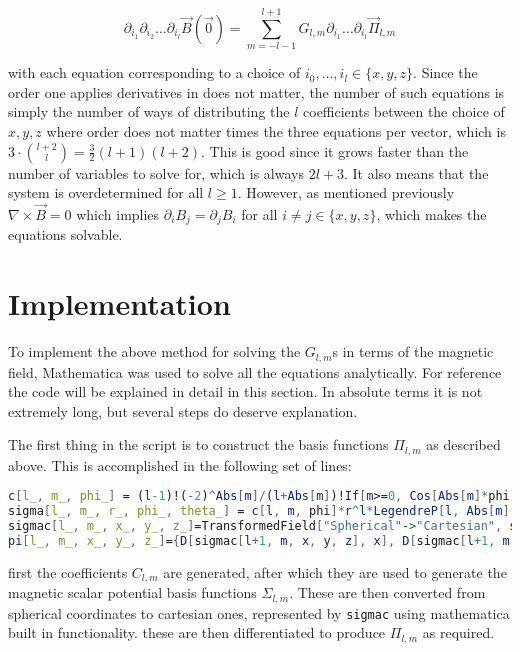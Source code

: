 \documentclass{article}
\begin{document}
\begin{equation}
    \partial_{i_1}\partial_{i_2}\ldots\partial_{i_l}\vec B(\vec0)=\sum_{m=-l-1}^{l+1}G_{l, m}\partial_{i_1}\ldots\partial_{i_l}\vec\Pi_{l, m}
\end{equation}

with each equation corresponding to a choice of $i_0, \ldots, i_l\in \{x, y, z\}$. Since the order one applies derivatives in does not matter, the number of such equations is simply the number of ways of distributing the $l$ coefficients between the choice of ${x, y, z}$ where order does not matter times the three equations per vector, which is $3\cdot{{l+2}\choose{l}}=\frac32(l+1)(l+2)$. This is good since it grows faster than the number of variables to solve for, which is always $2l+3$. It also means that the system is overdetermined for all $l\geq1$. However, as mentioned previously $\nabla\times\vec B=0$ which implies $\partial_iB_j=\partial_jB_i$ for all $i\neq j\in\{x, y, z\}$, which makes the equations solvable. 

\section{Implementation}

To implement the above method for solving the $G_{l,m}$s in terms of the magnetic field, Mathematica was used to solve all the equations analytically. For reference the code will be explained in detail in this section. In absolute terms it is not extremely long, but several steps do deserve explanation. 

The first thing in the script is to construct the basis functions $\Pi_{l, m}$ as described above. This is accomplished in the following set of lines: 

\begin{lstlisting}[language=Mathematica]
c[l_, m_, phi_] = (l-1)!(-2)^Abs[m]/(l+Abs[m])!If[m>=0, Cos[Abs[m]*phi], Sin[Abs[m]*phi]];
sigma[l_, m_, r_, phi_, theta_] = c[l, m, phi]*r^l*LegendreP[l, Abs[m], Cos[theta]];
sigmac[l_, m_, x_, y_, z_]=TransformedField["Spherical"->"Cartesian", sigma[l, m, r, phi, theta], {r, theta, phi}->{x, y, z}];
pi[l_, m_, x_, y_, z_]={D[sigmac[l+1, m, x, y, z], x], D[sigmac[l+1, m, x, y, z], y], D[sigmac[l+1, m, x, y, z], z]};
\end{lstlisting}

first the coefficients $C_{l, m}$ are generated, after which they are used to generate the magnetic scalar potential basis functions $\Sigma_{l, m}$. These are then converted from spherical coordinates to cartesian ones, represented by \lstinline{sigmac} using mathematica built in functionality. these are then differentiated to produce $\Pi_{l, m}$ as required. 
\end{document}
